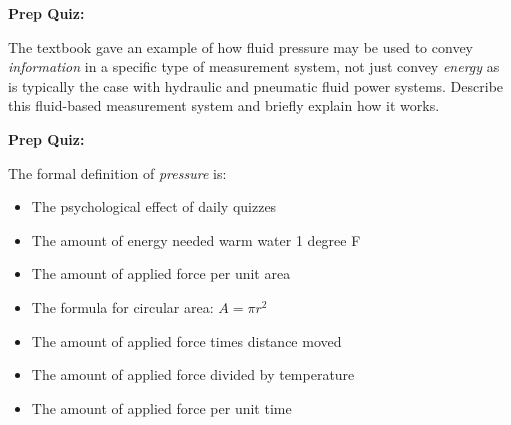 \vfil \eject

\noindent
{\bf Prep Quiz:}

The textbook gave an example of how fluid pressure may be used to convey {\it information} in a specific type of measurement system, not just convey {\it energy} as is typically the case with hydraulic and pneumatic fluid power systems.  Describe this fluid-based measurement system and briefly explain how it works.











\vfil \eject

\noindent
{\bf Prep Quiz:}

The formal definition of {\it pressure} is:

\begin{itemize}
\item{} The psychological effect of daily quizzes
\vskip 5pt 
\item{} The amount of energy needed warm water 1 degree F
\vskip 5pt 
\item{} The amount of applied force per unit area
\vskip 5pt 
\item{} The formula for circular area: $A = \pi r^2$
\vskip 5pt 
\item{} The amount of applied force times distance moved
\vskip 5pt 
\item{} The amount of applied force divided by temperature
\vskip 5pt 
\item{} The amount of applied force per unit time
\end{itemize}





